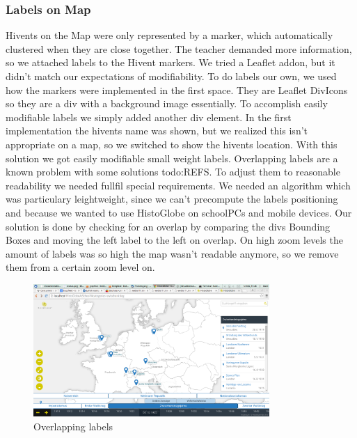 \subsubsection{Labels on Map}
Hivents on the Map were only represented by a marker, which automatically clustered when they are close together.
The teacher demanded more information, so we attached labels to the Hivent markers.
We tried a Leaflet addon, but it didn't match our expectations of modifiability.
To do labels our own, we used how the markers were implemented in the first space. They are Leaflet DivIcons so they are a div with a background image essentially. To accomplish easily modifiable labels we simply added another div element.
In the first implementation the hivents name was shown, but we realized this isn't appropriate on a map, so we switched to show the hivents location. With this solution we got easily modifiable small weight labels.
Overlapping labels are a known problem with some solutions todo:REFS.
To adjust them to reasonable readability we needed fullfil special requirements.
We needed an algorithm which was particulary leightweight, since we can't precompute the labels positioning and because we wanted to use HistoGlobe on schoolPCs and mobile devices.
Our solution is done by checking for an overlap by comparing the divs Bounding Boxes and moving the left label to the left on overlap.
On high zoom levels the amount of labels was so high the map wasn't readable anymore, so we remove them from a certain zoom level on.

  \begin{figure}[H]
\begin{center}
  \includegraphics[width=0.8\textwidth]{graphics/overlapping_labels.png}
  \end{center}

  \caption{Overlapping labels}
  \label{fig:overlapping_labels}
  \end{figure}

